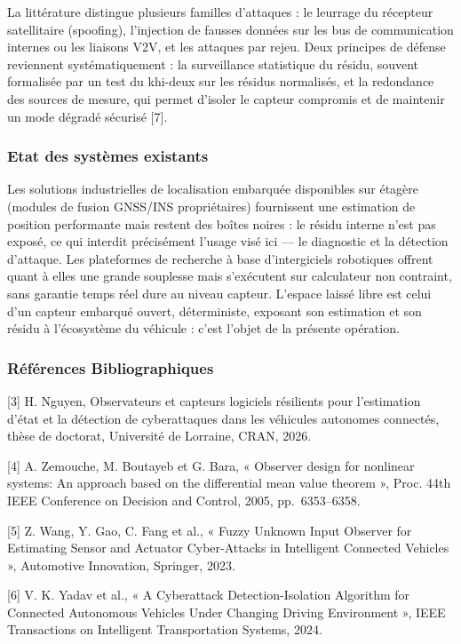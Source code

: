 \documentclass[11pt,a4paper]{article}
\begin{document}
La littérature distingue plusieurs familles d’attaques : le leurrage du récepteur satellitaire (spoofing), l’injection de fausses données sur les bus de communication internes ou les liaisons V2V, et les attaques par rejeu. Deux principes de défense reviennent systématiquement : la surveillance statistique du résidu, souvent formalisée par un test du khi-deux sur les résidus normalisés, et la redondance des sources de mesure, qui permet d’isoler le capteur compromis et de maintenir un mode dégradé sécurisé [7].

\subsubsection{Etat des systèmes existants}

Les solutions industrielles de localisation embarquée disponibles sur étagère (modules de fusion GNSS/INS propriétaires) fournissent une estimation de position performante mais restent des boîtes noires : le résidu interne n’est pas exposé, ce qui interdit précisément l’usage visé ici — le diagnostic et la détection d’attaque. Les plateformes de recherche à base d’intergiciels robotiques offrent quant à elles une grande souplesse mais s’exécutent sur calculateur non contraint, sans garantie temps réel dure au niveau capteur. L’espace laissé libre est celui d’un capteur embarqué ouvert, déterministe, exposant son estimation et son résidu à l’écosystème du véhicule : c’est l’objet de la présente opération.

\subsubsection{Références Bibliographiques}

[3] H. Nguyen, Observateurs et capteurs logiciels résilients pour l’estimation d’état et la détection de cyberattaques dans les véhicules autonomes connectés, thèse de doctorat, Université de Lorraine, CRAN, 2026.

[4] A. Zemouche, M. Boutayeb et G. Bara, « Observer design for nonlinear systems: An approach based on the differential mean value theorem », Proc. 44th IEEE Conference on Decision and Control, 2005, pp.~6353–6358.

[5] Z. Wang, Y. Gao, C. Fang et al., « Fuzzy Unknown Input Observer for Estimating Sensor and Actuator Cyber-Attacks in Intelligent Connected Vehicles », Automotive Innovation, Springer, 2023.

[6] V. K. Yadav et al., « A Cyberattack Detection-Isolation Algorithm for Connected Autonomous Vehicles Under Changing Driving Environment », IEEE Transactions on Intelligent Transportation Systems, 2024.
\end{document}
